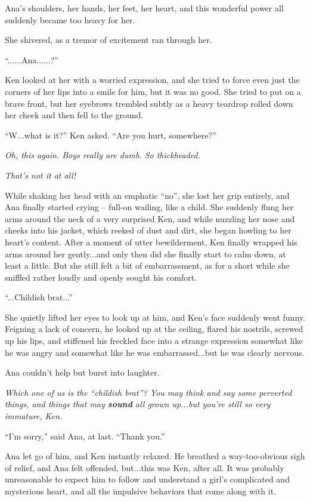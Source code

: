 \documentclass[
]{article}
\begin{document}
Ana's shoulders, her hands, her feet, her heart, and this wonderful
power all suddenly became too heavy for her.

She shivered, as a tremor of excitement ran through her.

``......Ana......?''

Ken looked at her with a worried expression, and she tried to force even
just the corners of her lips into a smile for him, but it was no good.
She tried to put on a brave front, but her eyebrows trembled subtly as a
heavy teardrop rolled down her cheek and then fell to the ground.

``W...what is it?'' Ken asked. ``Are you hurt, somewhere?''

\emph{Oh, this again. Boys really are dumb. So thickheaded.}

\emph{That's not it at all!}

While shaking her head with an emphatic ``no'', she lost her grip
entirely, and Ana finally started crying -- full-on wailing, like a
child. She suddenly flung her arms around the neck of a very surprised
Ken, and while nuzzling her nose and cheeks into his jacket, which
reeked of dust and dirt, she began howling to her heart's content. After
a moment of utter bewilderment, Ken finally wrapped his arms around her
gently...and only then did she finally start to calm down, at least a
little. But she still felt a bit of embarrassment, as for a short while
she sniffled rather loudly and openly sought his comfort.

``...Childish brat...''

She quietly lifted her eyes to look up at him, and Ken's face suddenly
went funny. Feigning a lack of concern, he looked up at the ceiling,
flared his nostrils, screwed up his lips, and stiffened his freckled
face into a strange expression somewhat like he was angry and somewhat
like he was embarrassed...but he was clearly nervous.

Ana couldn't help but burst into laughter.

\emph{Which one of us is the ``childish brat''? You may think and say
some perverted things, and things that may \textbf{sound} all grown
up...but you're still so very immature, Ken.}

``I'm sorry,'' said Ana, at last. ``Thank you.''

Ana let go of him, and Ken instantly relaxed. He breathed a
way-too-obvious sigh of relief, and Ana felt offended, but...this was
Ken, after all. It was probably unreasonable to expect him to follow and
understand a girl's complicated and mysterious heart, and all the
impulsive behaviors that come along with it.
\end{document}
